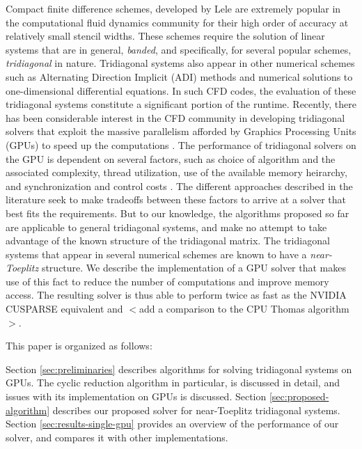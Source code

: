 \documentclass{elsarticle}
\begin{document}
Compact finite difference schemes, developed by
Lele\cite{lele1992compact} 
are extremely popular in the computational fluid dynamics community
for their high order of accuracy at relatively small stencil widths.
These schemes require the solution of
linear systems that are
in general, \emph{banded}, and specifically,
for several popular schemes, \emph{tridiagonal} in nature.
Tridiagonal systems also appear in other numerical schemes
such as
Alternating Direction Implicit (ADI) methods
\cite{1955ADI}
and numerical solutions to one-dimensional differential equations.
In such CFD codes,
the evaluation of these tridiagonal systems constitute
a significant portion of the runtime.
Recently, there has been considerable interest in
the CFD community
in developing tridiagonal solvers
that exploit the massive parallelism afforded by
Graphics Processing Units (GPUs)
to speed up the computations
\cite{tutkun2012gpu}
\cite{esfahanian2014efficient}
\cite{GoSt11CR}.
The performance of tridiagonal solvers on the GPU is
dependent on several factors,
such as
choice of algorithm and the associated complexity,
thread utilization,
use of the available memory heirarchy,
and synchronization and control costs
\cite{Zhang2010FTS}.
The different approaches described in the literature
seek to make tradeoffs between these factors
to arrive at a solver that best fits the requirements.
But to our knowledge, the algorithms proposed so far
are applicable to general tridiagonal systems,
and make no attempt to take advantage of the known structure
of the tridiagonal matrix.
The tridiagonal systems that appear in several numerical schemes
are known to have a \emph{near-Toeplitz} structure.
We describe the implementation of a GPU solver that
makes use of this fact to
reduce the number of computations and
improve memory access.
The resulting solver is thus able to perform twice as fast as
the NVIDIA CUSPARSE equivalent
and $<$add a comparison to the CPU Thomas algorithm$>$.

This paper is organized as follows:

Section \ref{sec:preliminaries}
describes algorithms for solving tridiagonal systems on GPUs.
The cyclic reduction algorithm in particular, is discussed in detail,
and issues with its implementation on GPUs is discussed.
Section \ref{sec:proposed-algorithm}
describes our proposed solver for near-Toeplitz tridiagonal systems.
Section \ref{sec:results-single-gpu}
provides an overview of the performance of our solver,
and compares it with other implementations.

\end{document}
